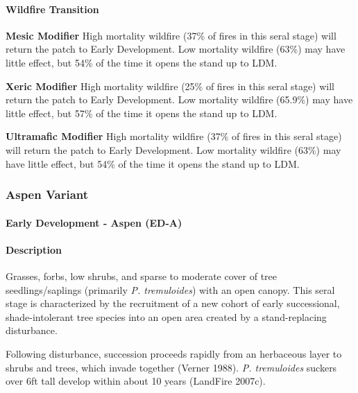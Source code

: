 \paragraph{Wildfire Transition}

\begin{adjustwidth}{2cm}{}
\textbf{Mesic Modifier } High mortality wildfire (37\% of fires in this seral stage) will return the patch to Early Development. Low mortality wildfire (63\%) may have little effect, but 54\% of the time it opens the stand up to LDM. 

\medskip
\noindent \textbf{Xeric Modifier} High mortality wildfire (25\% of fires in this seral stage) will return the patch to Early Development. Low mortality wildfire (65.9\%) may have little effect, but 57\% of the time it opens the stand up to LDM. 

\medskip
\noindent \textbf{Ultramafic Modifier} High mortality wildfire (37\% of fires in this seral stage) will return the patch to Early Development. Low mortality wildfire (63\%) may have little effect, but 54\% of the time it opens the stand up to LDM.

\end{adjustwidth}

\noindent\hrulefill
\noindent\hrulefill

\subsubsection{Aspen Variant}

\paragraph{Early Development - Aspen (ED-A)}

\paragraph{Description} Grasses, forbs, low shrubs, and sparse to moderate cover of tree seedlings/saplings (primarily \emph{P. tremuloides}) with an open canopy. This seral stage is characterized by the recruitment of a new cohort of early successional, shade-intolerant tree species into an open area created by a stand-replacing disturbance.

Following disturbance, succession proceeds rapidly from an herbaceous layer to shrubs and trees, which invade together (Verner 1988). \emph{P. tremuloides} suckers over 6ft tall develop within about 10 years (LandFire 2007c). 



